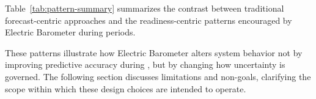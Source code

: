 Table~\ref{tab:pattern-summary} summarizes the contrast between traditional forecast-centric
approaches and the readiness-centric patterns encouraged by Electric Barometer during \LTO{}
periods.



These patterns illustrate how Electric Barometer alters system behavior not by improving
predictive accuracy during \LTOs{}, but by changing how uncertainty is governed. The following
section discusses limitations and non-goals, clarifying the scope within which these design choices
are intended to operate.
